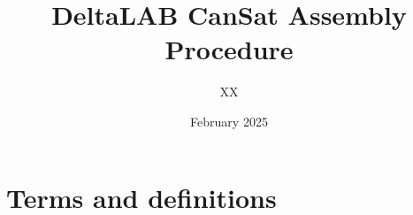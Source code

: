 \documentclass{article}
\title{DeltaLAB CanSat Assembly Procedure}
\author{XX}
\date{February 2025}
\begin{document}
\maketitle

\section{Terms and definitions}
\end{document}
